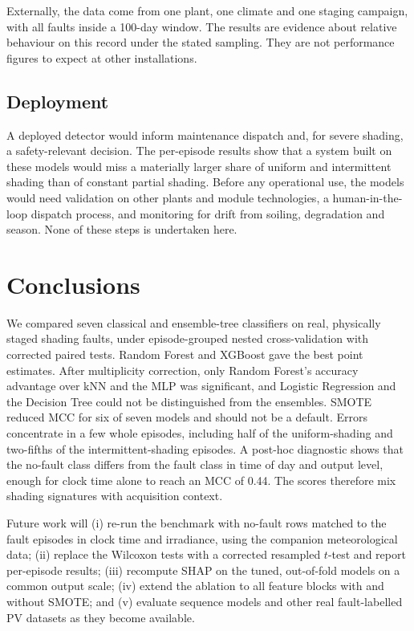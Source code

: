 \documentclass[11pt,a4paper]{article}
\begin{document}
Externally, the data come from one plant, one climate and one staging campaign, with all faults inside a 100-day window. The results are evidence about relative behaviour on this record under the stated sampling. They are not performance figures to expect at other installations.

\subsection{Deployment}

A deployed detector would inform maintenance dispatch and, for severe shading, a safety-relevant decision. The per-episode results show that a system built on these models would miss a materially larger share of uniform and intermittent shading than of constant partial shading. Before any operational use, the models would need validation on other plants and module technologies, a human-in-the-loop dispatch process, and monitoring for drift from soiling, degradation and season. None of these steps is undertaken here.

\section{Conclusions}

We compared seven classical and ensemble-tree classifiers on real, physically staged shading faults, under episode-grouped nested cross-validation with corrected paired tests. Random Forest and XGBoost gave the best point estimates. After multiplicity correction, only Random Forest's accuracy advantage over kNN and the MLP was significant, and Logistic Regression and the Decision Tree could not be distinguished from the ensembles. SMOTE reduced MCC for six of seven models and should not be a default. Errors concentrate in a few whole episodes, including half of the uniform-shading and two-fifths of the intermittent-shading episodes. A post-hoc diagnostic shows that the no-fault class differs from the fault class in time of day and output level, enough for clock time alone to reach an MCC of 0.44. The scores therefore mix shading signatures with acquisition context.

Future work will (i) re-run the benchmark with no-fault rows matched to the fault episodes in clock time and irradiance, using the companion meteorological data; (ii) replace the Wilcoxon tests with a corrected resampled $t$-test and report per-episode results; (iii) recompute SHAP on the tuned, out-of-fold models on a common output scale; (iv) extend the ablation to all feature blocks with and without SMOTE; and (v) evaluate sequence models and other real fault-labelled PV datasets as they become available.
\end{document}
